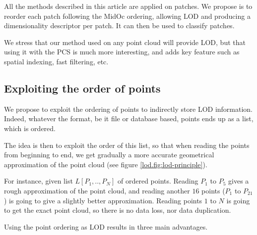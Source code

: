 		All the methods described in this article are applied on patches.
		We propose is to reorder each patch following the MidOc ordering, allowing LOD and producing a dimensionality descriptor per patch. It can then be used to classify patches.
		
		We stress that our method used on any point cloud will provide LOD,
		but that using it with the PCS is much more interesting,
		and adds key feature such as spatial indexing, fast filtering, etc. 
 
 	 
	 	 
	\subsection{Exploiting the order of points}
		\label{lod.method.order}
			
			
			We propose to exploit the ordering of points to indirectly store LOD information.
			Indeed, whatever the format, be it file or database based, points ends up as a list, which is ordered.
			 
			The idea is then to exploit the order of this list, so that when reading the points from beginning to end, we get gradually a more accurate geometrical approximation of the point cloud (see figure \ref{lod.fig:lod-principle}). 
			 
			For instance, given list $L[P_1,..,P_N]$ of ordered points.
			Reading $P_1$ to $P_5$ gives a rough approximation of the point cloud, and reading another $16$ points ($P_1$ to $P_{21}$) is going to give a slightly better approximation. Reading points $1$ to $N$ is going to get the exact point cloud, so there is no data loss, nor data duplication.
		 
			Using the point ordering as LOD results in three main advantages.
